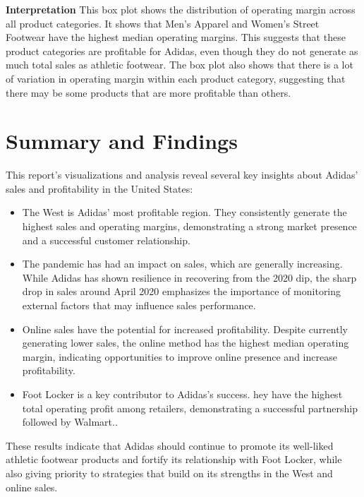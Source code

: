 \documentclass{article}\usepackage[]{graphicx}\usepackage[]{xcolor}
\begin{document}
\textbf{Interpretation} This box plot shows the distribution of operating margin across all product categories. It shows that Men's Apparel and Women's Street Footwear have the highest median operating margins. This suggests that these product categories are profitable for Adidas, even though they do not generate as much total sales as athletic footwear. The box plot also shows that there is a lot of variation in operating margin within each product category, suggesting that there may be some products that are more profitable than others.

\newpage

\section{Summary and Findings}

This report's visualizations and analysis reveal several key insights about Adidas' sales and profitability in the United States:

\begin{itemize}
    \item The West is Adidas' most profitable region. They consistently generate the highest sales and operating margins, demonstrating a strong market presence and a successful customer relationship.

    \item The pandemic has had an impact on sales, which are generally increasing. While Adidas has shown resilience in recovering from the 2020 dip, the sharp drop in sales around April 2020 emphasizes the importance of monitoring external factors that may influence sales performance.

    \item Online sales have the potential for increased profitability. Despite currently generating lower sales, the online method has the highest median operating margin, indicating opportunities to improve online presence and increase profitability.

    \item Foot Locker is a key contributor to Adidas's success. hey have the highest total operating profit among retailers, demonstrating a successful partnership followed by Walmart..
\end{itemize}

These results indicate that Adidas should continue to promote its well-liked athletic footwear products and fortify its relationship with Foot Locker, while also giving priority to strategies that build on its strengths in the West and online sales.
\end{document}
